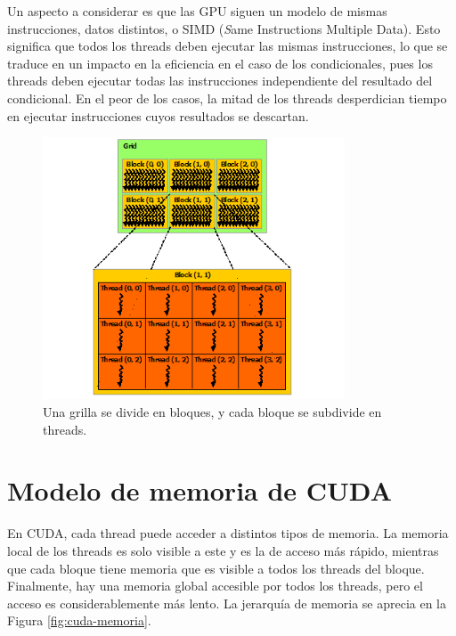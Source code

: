Un aspecto a considerar es que las GPU siguen un modelo de mismas instrucciones, datos distintos, o SIMD ({\textit Same Instructions Multiple Data}). Esto significa que todos los threads deben ejecutar las mismas instrucciones, lo que se traduce en un impacto en la eficiencia en el caso de los condicionales, pues los threads deben ejecutar todas las instrucciones independiente del resultado del condicional. En el peor de los casos, la mitad de los threads desperdician tiempo en ejecutar instrucciones cuyos resultados se descartan.
\begin{figure}[H]
    \centering
    \includegraphics[width=0.8\textwidth]{figs/cuda-grilla.png}
    \caption{Una grilla se divide en bloques, y cada bloque se subdivide en threads.}
    \label{fig:cuda-grilla}
\end{figure}
\section{Modelo de memoria de CUDA}\label{sec:modelo-memoria}
En CUDA, cada thread puede acceder a distintos tipos de memoria. La memoria local de los threads es solo visible a este y es la de acceso más rápido, mientras que cada bloque tiene memoria que es visible a todos los threads del bloque. Finalmente, hay una memoria global accesible por todos los threads, pero el acceso es considerablemente más lento. La jerarquía de memoria se aprecia en la Figura \ref{fig:cuda-memoria}.


